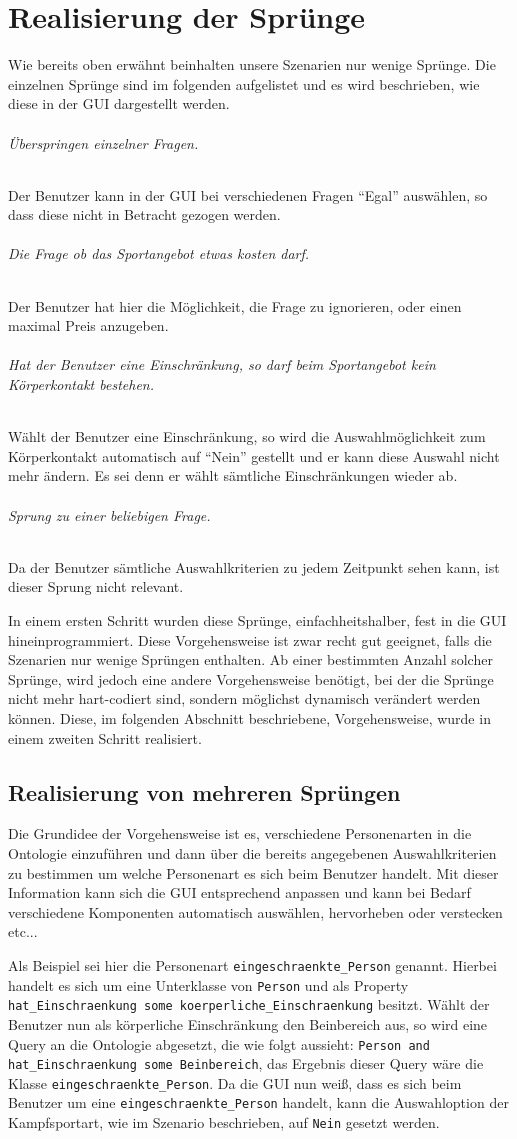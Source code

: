 \chapter{Realisierung der Sprünge}
Wie bereits oben erwähnt beinhalten unsere Szenarien nur wenige Sprünge. Die einzelnen Sprünge sind im folgenden aufgelistet und es wird beschrieben, wie diese in der GUI dargestellt werden. 

\subparagraph{Überspringen einzelner Fragen.} Der Benutzer kann in der GUI bei verschiedenen Fragen "`Egal"' auswählen, so dass diese nicht in Betracht gezogen werden.
\subparagraph{Die Frage ob das Sportangebot etwas kosten darf.} Der Benutzer hat hier die Möglichkeit, die Frage zu ignorieren, oder einen maximal Preis anzugeben.
\subparagraph{Hat der Benutzer eine Einschränkung, so darf beim Sportangebot kein Körperkontakt bestehen.} Wählt der Benutzer eine Einschränkung, so wird die Auswahlmöglichkeit zum Körperkontakt automatisch auf "`Nein"' gestellt und er kann diese Auswahl nicht mehr ändern. Es sei denn er wählt sämtliche Einschränkungen wieder ab.
\subparagraph{Sprung zu einer beliebigen Frage.} Da der Benutzer sämtliche Auswahlkriterien zu jedem Zeitpunkt sehen kann, ist dieser Sprung nicht relevant.

In einem ersten Schritt wurden diese Sprünge, einfachheitshalber, fest in die GUI hineinprogrammiert. Diese Vorgehensweise ist zwar recht gut geeignet, falls die Szenarien nur wenige Sprüngen enthalten. Ab einer bestimmten Anzahl solcher Sprünge, wird jedoch eine andere Vorgehensweise benötigt, bei der die Sprünge nicht mehr hart-codiert sind, sondern möglichst dynamisch verändert werden können. Diese, im folgenden Abschnitt beschriebene, Vorgehensweise, wurde in einem zweiten Schritt realisiert.   

\section{Realisierung von mehreren Sprüngen}

Die Grundidee der Vorgehensweise ist es, verschiedene Personenarten in die Ontologie einzuführen und dann über die bereits angegebenen Auswahlkriterien zu bestimmen um welche Personenart es sich beim Benutzer handelt. Mit dieser Information kann sich die GUI entsprechend anpassen und kann bei Bedarf verschiedene Komponenten automatisch auswählen, hervorheben oder verstecken etc...

Als Beispiel sei hier die Personenart \lstinline"eingeschraenkte_Person" genannt. Hierbei handelt es sich um eine Unterklasse von \lstinline"Person" und als Property \lstinline"hat_Einschraenkung some koerperliche_Einschraenkung" besitzt. Wählt der Benutzer nun als körperliche Einschränkung den Beinbereich aus, so wird eine Query an die Ontologie abgesetzt, die wie folgt aussieht: \lstinline"Person and hat_Einschraenkung some Beinbereich", das Ergebnis dieser Query wäre die Klasse \lstinline"eingeschraenkte_Person". Da die GUI nun weiß, dass es sich beim Benutzer um eine \lstinline"eingeschraenkte_Person" handelt, kann die Auswahloption der Kampfsportart, wie im Szenario beschrieben, auf \lstinline"Nein" gesetzt werden.

